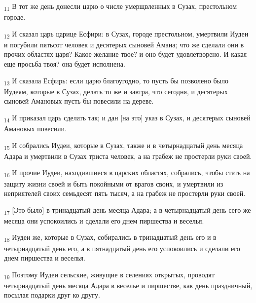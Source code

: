 \begin{tcolorbox}
\textsubscript{11} В тот же день донесли царю о числе умерщвленных в Сузах, престольном городе.
\end{tcolorbox}
\begin{tcolorbox}
\textsubscript{12} И сказал царь царице Есфири: в Сузах, городе престольном, умертвили Иудеи и погубили пятьсот человек и десятерых сыновей Амана; что же сделали они в прочих областях царя? Какое желание твое? и оно будет удовлетворено. И какая еще просьба твоя? она будет исполнена.
\end{tcolorbox}
\begin{tcolorbox}
\textsubscript{13} И сказала Есфирь: если царю благоугодно, то пусть бы позволено было Иудеям, которые в Сузах, делать то же и завтра, что сегодня, и десятерых сыновей Амановых пусть бы повесили на дереве.
\end{tcolorbox}
\begin{tcolorbox}
\textsubscript{14} И приказал царь сделать так; и дан [на это] указ в Сузах, и десятерых сыновей Амановых повесили.
\end{tcolorbox}
\begin{tcolorbox}
\textsubscript{15} И собрались Иудеи, которые в Сузах, также и в четырнадцатый день месяца Адара и умертвили в Сузах триста человек, а на грабеж не простерли руки своей.
\end{tcolorbox}
\begin{tcolorbox}
\textsubscript{16} И прочие Иудеи, находившиеся в царских областях, собрались, чтобы стать на защиту жизни своей и быть покойными от врагов своих, и умертвили из неприятелей своих семьдесят пять тысяч, а на грабеж не простерли руки своей.
\end{tcolorbox}
\begin{tcolorbox}
\textsubscript{17} [Это было] в тринадцатый день месяца Адара; а в четырнадцатый день сего же месяца они успокоились и сделали его днем пиршества и веселья.
\end{tcolorbox}
\begin{tcolorbox}
\textsubscript{18} Иудеи же, которые в Сузах, собирались в тринадцатый день его и в четырнадцатый день его, а в пятнадцатый день его успокоились и сделали его днем пиршества и веселья.
\end{tcolorbox}
\begin{tcolorbox}
\textsubscript{19} Поэтому Иудеи сельские, живущие в селениях открытых, проводят четырнадцатый день месяца Адара в веселье и пиршестве, как день праздничный, посылая подарки друг ко другу.
\end{tcolorbox}
